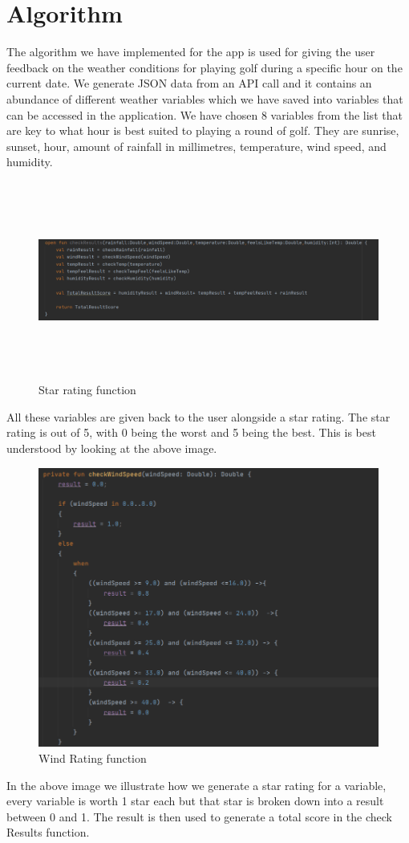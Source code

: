 \section{Algorithm}
The algorithm we have implemented for the app is used for giving the user feedback on the weather conditions for playing golf during a specific hour on the current date. We generate JSON data from an API call and it contains an abundance of different weather variables which we have saved into variables that can be accessed in the application. We have chosen 8 variables from the list that are key to what hour is best suited to playing a round of golf. They are sunrise, sunset, hour, amount of rainfall in millimetres, temperature, wind speed, and humidity.
\begin{figure}[H]
    \centering
    \includegraphics[width=13cm,height =6.5cm]{img/starRating.PNG}
    \caption{Star rating function}
    \label{fig:altas config}
\end{figure}
All these variables are given back to the user alongside a star rating. The star rating is out of 5, with 0 being the worst and 5 being the best. This is best understood by looking at the above image.


\begin{figure}[H]
    \centering
    \includegraphics[width=12cm]{img/starEx.PNG}
    \caption{Wind Rating function}
    \label{fig:altas config}
\end{figure}
In the above image we illustrate how we generate a star rating for a variable, every variable is worth 1 star each but that star is broken down into a result between 0 and 1. The result is then used to generate a total score in the check Results function.
